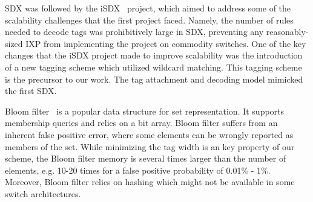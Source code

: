 SDX was followed by the iSDX~\cite{isdx} project, which aimed to address some of the scalability challenges that the first project faced. Namely, the number of rules needed to decode tags was prohibitively large in SDX, preventing any reasonably-sized IXP from implementing the project on commodity switches. One of the key changes that the iSDX project made to improve scalability was the introduction of a new tagging scheme which utilized wildcard matching. This tagging scheme is the precursor to our work. The tag attachment and decoding model mimicked the first SDX.

Bloom filter~\cite{Bloom} is a popular data structure for set representation. It supports membership queries and relies on a bit array. Bloom filter suffers from an inherent false positive error, where some elements can be wrongly reported as members of the set. While minimizing the tag width is an key property of our scheme, the Bloom filter memory is several times larger than the number of elements, e.g. 10-20 times for a false positive probability of 0.01\% - 1\%. Moreover, Bloom filter relies on hashing which might not be available in some switch architectures.

